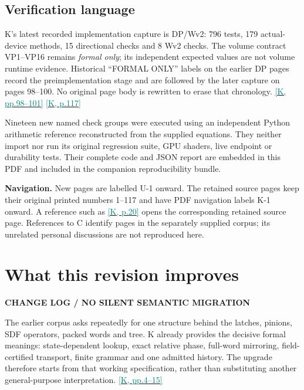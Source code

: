 \documentclass[11pt,a4paper]{article}
\newcommand{\kref}[1]{\hyperlink{baseline.#1}{\textcolor{teal}{[K, p.#1]}}}
\newcommand{\krange}[2]{\hyperlink{baseline.#1}{\textcolor{teal}{[K, pp.#1--#2]}}}
\newcommand{\status}[1]{{\sffamily\bfseries\scriptsize\color{teal}#1}\par}
\newcommand{\code}[1]{\texttt{\detokenize{#1}}}
\newcommand{\sectionstart}[1]{\par\addvspace{18pt}\Needspace{12\baselineskip}\section{#1}}
\theoremstyle{lpstyle}
\begin{document}
\subsection*{Verification language}
K's latest recorded implementation capture is DP/Wv2: 796 tests, 179 actual-device methods, 15 directional checks and 8 Wv2 checks. The volume contract VP1--VP16 remains \emph{formal only}; its independent expected values are not volume runtime evidence. Historical ``FORMAL ONLY'' labels on the earlier DP pages record the preimplementation stage and are followed by the later capture on pages 98--100. No original page body is rewritten to erase that chronology. \krange{98}{101} \kref{117}

Nineteen new named check groups were executed using an independent Python arithmetic reference reconstructed from the supplied equations. They neither import \code{solvefinite} nor run its original regression suite, GPU shaders, live endpoint or durability tests. Their complete code and JSON report are embedded in this PDF and included in the companion reproducibility bundle.

\clearpage
\tableofcontents
\vspace{5mm}
\begin{scopebox}
\textbf{Navigation.} New pages are labelled U-1 onward. The retained source pages keep their original printed numbers 1--117 and have PDF navigation labels K-1 onward. A reference such as \kref{20} opens the corresponding retained source page. References to C identify pages in the separately supplied corpus; its unrelated personal discussions are not reproduced here.
\end{scopebox}

\clearpage\sectionstart{What this revision improves}
\status{CHANGE LOG / NO SILENT SEMANTIC MIGRATION}
The earlier corpus asks repeatedly for one structure behind the latches, pinions, SDF operators, packed words and tree. K already provides the decisive formal meanings: state-dependent lookup, exact relative phase, full-word mirroring, field-certified transport, finite grammar and one admitted history. The upgrade therefore starts from that working specification, rather than substituting another general-purpose interpretation. \krange{4}{15}
\end{document}
